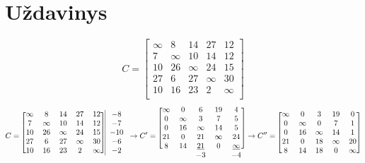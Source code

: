 \documentclass[a4paper,lithuanian]{article}
\begin{document}
\section{Uždavinys}
\[
C = 
\begin{bmatrix}
\infty  & 8  & 14 & 27 & 12 \\
7  & \infty  & 10 & 14 & 12 \\ 
10 & 26 & \infty  & 24 & 15 \\
27 & 6  & 27 & \infty  & 30 \\
10 & 16 & 23 & 2  & \infty  \\
\end{bmatrix}
\]
\[
C  = 
\begin{blockarray}{cccccc}
\begin{block}{[ccccc]|c}
  \infty  & 8  & 14 & 27 & 12 & -8 \\
  7  & \infty  & 10 & 14 & 12 & -7\\ 
  10 & 26 & \infty  & 24 & 15 & -10\\
  27 & 6  & 27 & \infty  & 30 & -6\\
  10 & 16 & 23 & 2  & \infty  & -2\\
\end{block}
\end{blockarray}%
\rightarrow{}
C' = 
\begin{blockarray}{ccccc}
\begin{block}{[ccccc]}
  \infty  & 0  & 6 & 19 & 4  \\
  0  & \infty  & 3 & 7 & 5 \\ 
  0 & 16 & \infty  & 14 & 5 \\
  21 & 0  & 21 & \infty  & 24 \\
  8 & 14 & \underline{21} & 0  & \underline{\infty{}}  \\
\end{block}
    &  & -3 & & -4 \\
\end{blockarray}
\rightarrow{}
C'' = 
\begin{blockarray}{ccccc}
\begin{block}{[ccccc]}
  \infty & 0      & 3      & 19     & 0      \\
  0      & \infty & 0      & 7      & 1      \\ 
  0      & 16     & \infty & 14     & 1      \\
  21     & 0      & 18     & \infty & 20     \\
  8      & 14     & 18     & 0      & \infty \\
\end{block}
\end{blockarray}
\]
\end{document}
